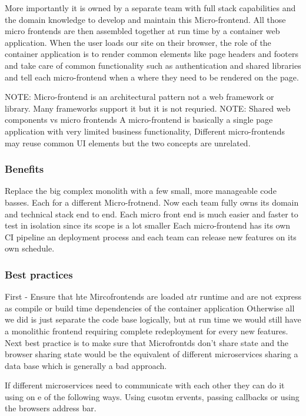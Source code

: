 \documentclass[a4paper, 11pt]{book}
\begin{document}
    More importantly it is owned by a separate team with full stack capabilities and the domain knowledge to develop and maintain this Micro-frontend.
    All those micro frontends are then assembled together at run time by a container web application.
    When the user loads our site on their browser, the role of the container application is to render common elements like page headers and footers and take care of common functionality such as authentication and shared libraries and tell each micro-frontend when a where they need to be rendered on the page.

    NOTE: Micro-frontend is an architectural pattern not a web framework or library. Many frameworks support it but it is not requried.
    NOTE: Shared web components vs micro frontends
    A micro-frontend is basically a single page application with very limited business functionality,
    Different micro-frontends may reuse common UI elements but the two concepts are unrelated.

    \subsubsection{Benefits}
    Replace the big complex monolith with a few small, more manageable code basses. Each for a different Micro-frotnend.
    Now each team fully owns its domain and technical stack end to end.
    Each micro front end is much easier and faster to test in isolation since its scope is a lot smaller
    Each micro-frontend has its own CI pipeline an deployment process and each team can release new features on its own schedule.

    \subsubsection{Best practices}
    First - Ensure that hte Mircofrontends are loaded atr runtime and are not express as compile or build time dependencies of the container application
    Otherwise all we did is just separate the code base logically, but at run time we would still have a monolithic frontend requiring complete redeployment for every new features.
    Next best practice is to make sure that Microfrontds don't share state and the browser sharing state would be the equivalent of different microservices sharing a data base which is generally a bad approach.

    If different microservices need to communicate with each other they can do it using on e of the following ways. Using cusotm ervents, passing callbacks or using the browsers address bar.
\end{document}
